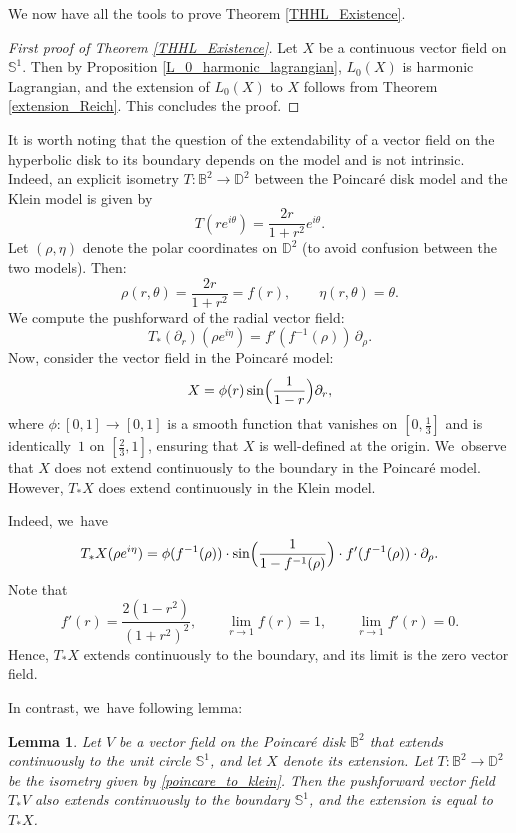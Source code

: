 \documentclass[10pt]{amsart}
\theoremstyle{plain}
\newtheorem{lemma}[cor]{Lemma}
\theoremstyle{definition}
\begin{document}
We now have all the tools to prove Theorem \ref{THHL_Existence}.
\begin{proof}[First proof of Theorem \ref{THHL_Existence}]
Let $X$ be a continuous vector field on $\mathbb{S}^1$. Then by Proposition \ref{L_0_harmonic_lagrangian}, $L_0(X)$ is harmonic Lagrangian, and the extension of $L_0(X)$ to $X$ follows from Theorem \ref{extension_Reich}. This concludes the proof.
\end{proof}
It is worth noting that the question of the extendability of a vector field on the hyperbolic disk to its boundary depends on the model and is not intrinsic. Indeed, an explicit isometry $T:\mathbb{B}^2 \to \mathbb{D}^2$ between the Poincaré disk model and the Klein model is given by
\begin{equation}\label{poincare_to_klein}
T(re^{i\theta}) = \frac{2r}{1 + r^2} e^{i\theta}.
\end{equation}
Let \((\rho, \eta)\) denote the polar coordinates on \(\mathbb{D}^2\) (to avoid confusion between the two models). Then:
\[
\rho(r, \theta) = \frac{2r}{1 + r^2} = f(r), \qquad \eta(r, \theta) = \theta.
\]
We compute the pushforward of the radial vector field:
\[
T_*(\partial_r)(\rho e^{i\eta}) = f'(f^{-1}(\rho))\, \partial_\rho.
\]
Now, consider the vector field in the Poincaré model:
\[
X = \phi(r) \sin\Bigl(\frac{1}{1 - r}\Bigr) \partial_r,
\]
where \(\phi : [0, 1] \to [0, 1]\) is a smooth function that vanishes on \([0, \tfrac{1}{3}]\) and is identically~\(1\) on \([\tfrac{2}{3}, 1]\), ensuring that \(X\) is well-defined at the origin. We~observe that \(X\) does not extend continuously to the boundary in the Poincaré model. However, \(T_*X\) does extend continuously in the Klein model.

Indeed, we~have
\[
T_*X(\rho e^{i\eta}) = \phi(f^{-1}(\rho)) \cdot \sin\Bigl(\frac{1}{1 - f^{-1}(\rho)}\Bigr) \cdot f'(f^{-1}(\rho)) \cdot \partial_\rho.
\]
Note that
\[
f'(r) = \frac{2(1 - r^2)}{(1 + r^2)^2}, \qquad
\lim_{r \to 1} f(r) = 1, \qquad \lim_{r \to 1} f'(r) = 0.
\]
Hence, \(T_*X\) extends continuously to the boundary, and its limit is the zero vector field.

In contrast, we~have following lemma:

\begin{lemma}\label{extension_B_to_D}
Let \(V\) be a vector field on the Poincaré disk \(\mathbb{B}^2\) that extends continuously to the unit circle \(\mathbb{S}^1\), and let \(X\) denote its extension. Let \(T:\mathbb{B}^2 \to \mathbb{D}^2\) be the isometry given by \eqref{poincare_to_klein}. Then the pushforward vector field \(T_*V\) also extends continuously to the boundary \(\mathbb{S}^1\), and the extension is equal to \(T_*X\).
\end{lemma}
\end{document}
